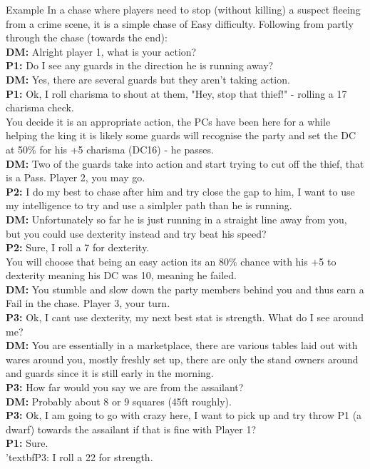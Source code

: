 \documentclass[10pt,twoside,twocolumn]{article}
\begin{document}
\begin{paperbox}{Example}
In a chase where players need to stop (without killing) a suspect fleeing from a crime scene, it is a simple chase of Easy difficulty. Following from partly through the chase (towards the end):\\

\textbf{DM:} Alright player 1, what is your action?\\
\textbf{P1:} Do I see any guards in the direction he is running away?\\
\textbf{DM:} Yes, there are several guards but they aren't taking action.\\
\textbf{P1:} Ok, I roll charisma to shout at them, "Hey, stop that thief!" - rolling a 17 charisma check.\\

You decide it is an appropriate action, the PCs have been here for a while helping the king it is likely some guards will recognise the party and set the DC at 50\% for his +5 charisma (DC16) - he passes.\\

\textbf{DM:} Two of the guards take into action and start trying to cut off the thief, that is a Pass. Player 2, you may go.\\
\textbf{P2:} I do my best to chase after him and try close the gap to him, I want to use my intelligence to try and use a simlpler path than he is running.\\
\textbf{DM:} Unfortunately so far he is just running in a straight line away from you, but you could use dexterity instead and try beat his speed?\\
\textbf{P2:} Sure, I roll a 7 for dexterity.\\

You will choose that being an easy action its an 80\% chance with his +5 to dexterity meaning his DC was 10, meaning he failed.\\

\textbf{DM:} You stumble and slow down the party members behind you and thus earn a Fail in the chase. Player 3, your turn.\\
\textbf{P3:} Ok, I cant use dexterity, my next best stat is strength. What do I see around me?\\
\textbf{DM:} You are essentially in a marketplace, there are various tables laid out with wares around you, mostly freshly set up, there are only the stand owners around and guards since it is still early in the morning.\\
\textbf{P3:} How far would you say we are from the assailant?\\
\textbf{DM:} Probably about 8 or 9 squares (45ft roughly).\\
\textbf{P3:} Ok, I am going to go with crazy here, I want to pick up and try throw P1 (a dwarf) towards the assailant if that is fine with Player 1?\\
\textbf{P1:} Sure.\\
'textbf{P3:} I roll a 22 for strength.\\


\end{paperbox}
\end{document}
